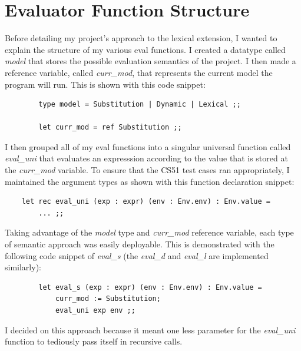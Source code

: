 \documentclass{article}
\begin{document}
\section{Evaluator Function Structure}
    Before detailing my project's approach to the lexical extension, I wanted to explain the structure of my various eval functions. I created a datatype called \textit{model} that stores the possible evaluation semantics of the project. I then made a reference variable, called \textit{curr\_mod}, that represents the current model the program will run. This is shown with this code snippet: \\
    \begin{verbatim}
        type model = Substitution | Dynamic | Lexical ;;
        
        let curr_mod = ref Substitution ;;
    \end{verbatim}
    I then grouped all of my eval functions into a singular universal function called \textit{eval\_uni} that evaluates an expresssion according to the value that is stored at the \textit{curr\_mod} variable. To ensure that the CS51 test cases ran appropriately, I maintained the argument types as shown with this function declaration snippet: \\ 
    \begin{verbatim}
    let rec eval_uni (exp : expr) (env : Env.env) : Env.value =
        ... ;;
    \end{verbatim}
    Taking advantage of the \textit{model} type and \textit{curr\_mod} reference variable, each type of semantic approach was easily deployable. This is demonstrated with the following code snippet of \textit{eval\_s} (the \textit{eval\_d} and \textit{eval\_l} are implemented similarly): \\
    \begin{verbatim}
        let eval_s (exp : expr) (env : Env.env) : Env.value =
            curr_mod := Substitution;
            eval_uni exp env ;;
    \end{verbatim}
    I decided on this approach because it meant one less parameter for the \textit{eval\_uni} function to tediously pass itself in recursive calls.
\end{document}
